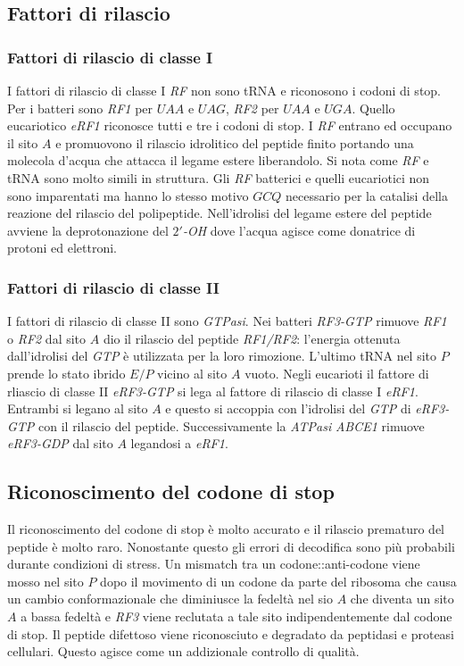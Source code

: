 \subsection{Fattori di rilascio}
\subsubsection{Fattori di rilascio di classe I}
I fattori di rilascio di classe I \emph{RF} non sono tRNA e riconosono i codoni di stop. Per i batteri sono \emph{RF1} per $UAA$ e $UAG$, \emph{RF2} per $UAA$ e $UGA$. Quello eucariotico 
\emph{eRF1} riconosce tutti e tre i codoni di stop. I \emph{RF} entrano ed occupano il sito $A$ e promuovono il rilascio idrolitico del peptide finito portando una molecola d'acqua che 
attacca il legame estere liberandolo. Si nota come \emph{RF} e tRNA sono molto simili in struttura. Gli \emph{RF} batterici e quelli eucariotici non sono imparentati ma hanno lo stesso 
motivo $GCQ$ necessario per la catalisi della reazione del rilascio del polipeptide. Nell'idrolisi del legame estere del peptide avviene la deprotonazione del \emph{$2'$-OH} dove 
l'acqua  agisce come donatrice di protoni ed elettroni.
\subsubsection{Fattori di rilascio di classe II}
I fattori di rilascio di classe II sono \emph{GTPasi}. Nei batteri \emph{RF3-GTP} rimuove \emph{RF1} o \emph{RF2} dal sito $A$ dio il rilascio del peptide \emph{RF1/RF2}: 
l'energia ottenuta dall'idrolisi del \emph{GTP} \`e utilizzata per la loro rimozione. L'ultimo tRNA nel sito $P$ prende lo stato ibrido $E/P$ vicino al sito $A$ vuoto. Negli eucarioti
il fattore di rliascio di classe II \emph{eRF3-GTP} si lega al fattore di rilascio di classe I \emph{eRF1}. Entrambi si legano al sito $A$ e questo si accoppia con l'idrolisi del
\emph{GTP} di \emph{eRF3-GTP} con il rilascio del peptide. Successivamente la \emph{ATPasi} \emph{ABCE1} rimuove \emph{eRF3-GDP} dal sito $A$ legandosi a \emph{eRF1}. 
\subsection{Riconoscimento del codone di stop}
Il riconoscimento del codone di stop \`e molto accurato e il rilascio prematuro del peptide \`e molto raro. Nonostante questo gli errori di decodifica sono pi\`u probabili durante
condizioni di stress. Un mismatch tra un codone::anti-codone viene mosso nel sito $P$ dopo il movimento di un codone da parte del ribosoma che causa un cambio conformazionale 
che diminiusce la fedelt\`a nel sio $A$ che diventa un sito $A$ a bassa fedelt\`a e \emph{RF3} viene reclutata a tale sito indipendentemente dal codone di stop. Il peptide difettoso
viene riconosciuto e degradato da peptidasi e proteasi cellulari. Questo agisce come un addizionale controllo di qualit\`a. 
